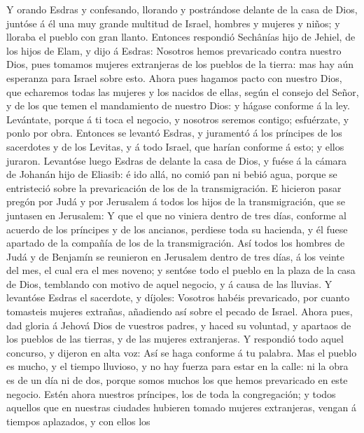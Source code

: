  Y orando Esdras y confesando, llorando y postrándose
delante de la casa de Dios, juntóse á él una muy grande multitud de
Israel, hombres y mujeres y niños; y lloraba el pueblo con gran llanto.
 Entonces respondió Sechânías hijo de Jehiel, de los hijos
de Elam, y dijo á Esdras: Nosotros hemos prevaricado contra nuestro
Dios, pues tomamos mujeres extranjeras de los pueblos de la tierra: mas
hay aún esperanza para Israel sobre esto.  Ahora pues
hagamos pacto con nuestro Dios, que echaremos todas las mujeres y los
nacidos de ellas, según el consejo del Señor, y de los que temen el
mandamiento de nuestro Dios: y hágase conforme á la ley. 
Levántate, porque á ti toca el negocio, y nosotros seremos contigo;
esfuérzate, y ponlo por obra.  Entonces se levantó Esdras, y
juramentó á los príncipes de los sacerdotes y de los Levitas, y á todo
Israel, que harían conforme á esto; y ellos juraron. 
Levantóse luego Esdras de delante la casa de Dios, y fuése á la cámara
de Johanán hijo de Eliasib: é ido allá, no comió pan ni bebió agua,
porque se entristeció sobre la prevaricación de los de la
transmigración.  E hicieron pasar pregón por Judá y por
Jerusalem á todos los hijos de la transmigración, que se juntasen en
Jerusalem:  Y que el que no viniera dentro de tres días,
conforme al acuerdo de los príncipes y de los ancianos, perdiese toda su
hacienda, y él fuese apartado de la compañía de los de la
transmigración.  Así todos los hombres de Judá y de Benjamín
se reunieron en Jerusalem dentro de tres días, á los veinte del mes, el
cual era el mes noveno; y sentóse todo el pueblo en la plaza de la casa
de Dios, temblando con motivo de aquel negocio, y á causa de las
lluvias.  Y levantóse Esdras el sacerdote, y díjoles:
Vosotros habéis prevaricado, por cuanto tomasteis mujeres extrañas,
añadiendo así sobre el pecado de Israel.  Ahora pues, dad
gloria á Jehová Dios de vuestros padres, y haced su voluntad, y apartaos
de los pueblos de las tierras, y de las mujeres extranjeras.
 Y respondió todo aquel concurso, y dijeron en alta voz:
Así se haga conforme á tu palabra.  Mas el pueblo es mucho,
y el tiempo lluvioso, y no hay fuerza para estar en la calle: ni la obra
es de un día ni de dos, porque somos muchos los que hemos prevaricado en
este negocio.  Estén ahora nuestros príncipes, los de toda
la congregación; y todos aquellos que en nuestras ciudades hubieren
tomado mujeres extranjeras, vengan á tiempos aplazados, y con ellos los
